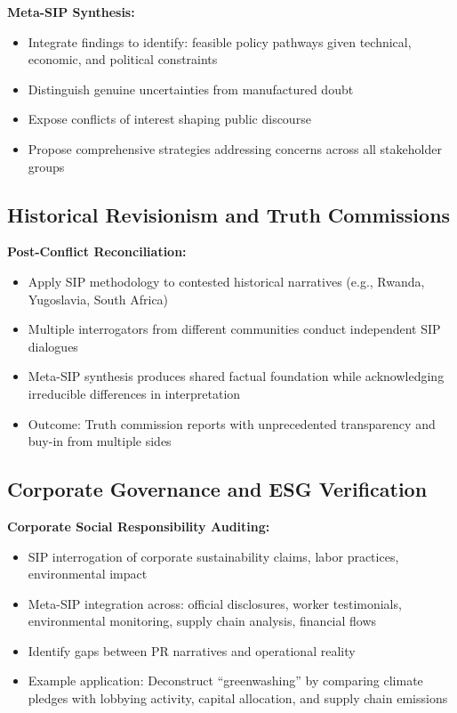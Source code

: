 \documentclass[11pt,a4paper]{article}
\begin{document}
\begin{small}
\textbf{Meta-SIP Synthesis:}
\begin{itemize}[nosep]
    \item Integrate findings to identify: feasible policy pathways given technical, economic, and political constraints
    \item Distinguish genuine uncertainties from manufactured doubt
    \item Expose conflicts of interest shaping public discourse
    \item Propose comprehensive strategies addressing concerns across all stakeholder groups
\end{itemize}

\subsection{Historical Revisionism and Truth Commissions}

\textbf{Post-Conflict Reconciliation:}
\begin{itemize}[nosep]
    \item Apply SIP methodology to contested historical narratives (e.g., Rwanda, Yugoslavia, South Africa)
    \item Multiple interrogators from different communities conduct independent SIP dialogues
    \item Meta-SIP synthesis produces shared factual foundation while acknowledging irreducible differences in interpretation
    \item Outcome: Truth commission reports with unprecedented transparency and buy-in from multiple sides
\end{itemize}

\subsection{Corporate Governance and ESG Verification}

\textbf{Corporate Social Responsibility Auditing:}
\begin{itemize}[nosep]
    \item SIP interrogation of corporate sustainability claims, labor practices, environmental impact
    \item Meta-SIP integration across: official disclosures, worker testimonials, environmental monitoring, supply chain analysis, financial flows
    \item Identify gaps between PR narratives and operational reality
    \item Example application: Deconstruct ``greenwashing'' by comparing climate pledges with lobbying activity, capital allocation, and supply chain emissions
\end{itemize}


\end{small}
\end{document}
